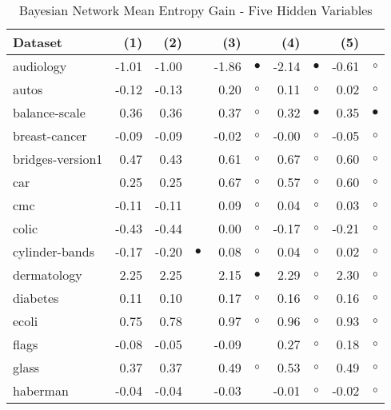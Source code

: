 \newpage
{\centering \footnotesize \begin{longtable}{lrr@{\hspace{0.1cm}}cr@{\hspace{0.1cm}}cr@{\hspace{0.1cm}}cr@{\hspace{0.1cm}}c}
\caption{\label{bnmeg5}Bayesian Network Mean Entropy Gain - Five Hidden Variables}
\\
\hline
Dataset & (1)& (2) & & (3) & & (4) & & (5) & \\
\hline
audiology & -1.01 & -1.00 &           & -1.86 & $\bullet$ & -2.14 & $\bullet$ & -0.61 &   $\circ$\\
autos & -0.12 & -0.13 &           &  0.20 &   $\circ$ &  0.11 &   $\circ$ &  0.02 &   $\circ$\\
balance-scale &  0.36 &  0.36 &           &  0.37 &   $\circ$ &  0.32 & $\bullet$ &  0.35 & $\bullet$\\
breast-cancer & -0.09 & -0.09 &           & -0.02 &   $\circ$ & -0.00 &   $\circ$ & -0.05 &   $\circ$\\
bridges-version1 &  0.47 &  0.43 &           &  0.61 &   $\circ$ &  0.67 &   $\circ$ &  0.60 &   $\circ$\\
car &  0.25 &  0.25 &           &  0.67 &   $\circ$ &  0.57 &   $\circ$ &  0.60 &   $\circ$\\
cmc & -0.11 & -0.11 &           &  0.09 &   $\circ$ &  0.04 &   $\circ$ &  0.03 &   $\circ$\\
colic & -0.43 & -0.44 &           &  0.00 &   $\circ$ & -0.17 &   $\circ$ & -0.21 &   $\circ$\\
cylinder-bands & -0.17 & -0.20 & $\bullet$ &  0.08 &   $\circ$ &  0.04 &   $\circ$ &  0.02 &   $\circ$\\
dermatology &  2.25 &  2.25 &           &  2.15 & $\bullet$ &  2.29 &   $\circ$ &  2.30 &   $\circ$\\
diabetes &  0.11 &  0.10 &           &  0.17 &   $\circ$ &  0.16 &   $\circ$ &  0.16 &   $\circ$\\
ecoli &  0.75 &  0.78 &           &  0.97 &   $\circ$ &  0.96 &   $\circ$ &  0.93 &   $\circ$\\
flags & -0.08 & -0.05 &           & -0.09 &           &  0.27 &   $\circ$ &  0.18 &   $\circ$\\
glass &  0.37 &  0.37 &           &  0.49 &   $\circ$ &  0.53 &   $\circ$ &  0.49 &   $\circ$\\
haberman & -0.04 & -0.04 &           & -0.03 &           & -0.01 &   $\circ$ & -0.02 &   $\circ$\\

\end{longtable}}
